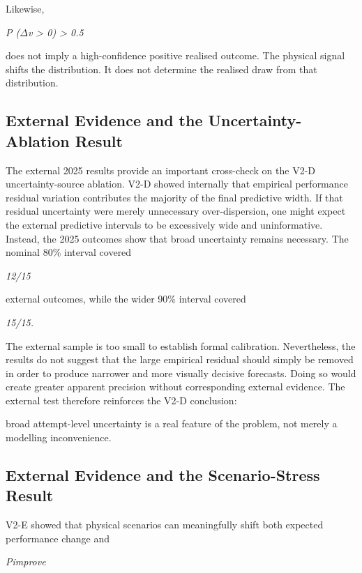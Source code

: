 Likewise,

\begin{center}\textit{P (\ensuremath{\Delta}v > 0) > 0.5}\end{center}

does not imply a high-confidence positive realised outcome. The physical signal shifts the distribution. It does not determine the realised draw from that distribution.

\subsection{External Evidence and the Uncertainty-Ablation Result}
The external 2025 results provide an important cross-check on the V2-D uncertainty-source ablation. V2-D showed internally that empirical performance residual variation contributes the majority of the final predictive width. If that residual uncertainty were merely unnecessary over-dispersion, one might expect the external predictive intervals to be excessively wide and uninformative. Instead, the 2025 outcomes show that broad uncertainty remains necessary. The nominal 80\% interval covered

\begin{center}\textit{12/15}\end{center}

external outcomes, while the wider 90\% interval covered

\begin{center}\textit{15/15.}\end{center}

The external sample is too small to establish formal calibration. Nevertheless, the results do not suggest that the large empirical residual should simply be removed in order to produce narrower and more visually decisive forecasts. Doing so would create greater apparent precision without corresponding external evidence. The external test therefore reinforces the V2-D conclusion:

broad attempt-level uncertainty is a real feature of the problem, not merely a modelling inconvenience.

\subsection{External Evidence and the Scenario-Stress Result}
V2-E showed that physical scenarios can meaningfully shift both expected performance change and

\begin{center}\textit{Pimprove}\end{center}

